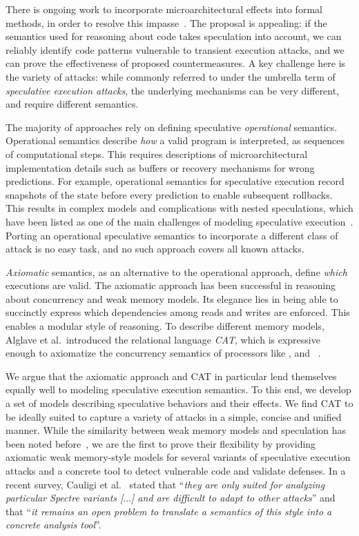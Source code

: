 \documentclass[conference]{IEEEtran}
\begin{document}
There is ongoing work to incorporate microarchitectural effects into formal methods, in order to resolve this impasse~\cite{CauligiDGTSRB20,DanielBR20,GuancialeBD20,GuarnieriKMRS20,spectaint,WangCBMR20,oo7,Wu019}. The proposal is appealing: if the semantics used for reasoning about code takes speculation into account, we can reliably identify code patterns vulnerable to transient execution attacks, and we can prove the effectiveness of proposed countermeasures. 
A key challenge here is the variety of attacks: while commonly referred to under the umbrella term of \emph{speculative execution attacks}, the underlying mechanisms can be very different, and require different semantics.


The majority of approaches rely on defining speculative \emph{operational} semantics.
Operational semantics describe \emph{how} a valid program is interpreted, as sequences of computational steps.
%
This requires descriptions of microarchitectural implementation details such as buffers or recovery mechanisms for wrong predictions. 
For example, operational semantics for speculative execution record snapshots of the state before every prediction to enable subsequent rollbacks.
% 
This results in complex models and complications with nested speculations, which have been listed as one of the main challenges of modeling speculative execution~\cite{GuarnieriKMRS20,OleksenkoTSF20}.
%
Porting an operational speculative semantics to incorporate a different class of attack is no easy task, and no such approach covers all known attacks. 

\emph{Axiomatic} semantics, as an alternative to the operational approach, define \emph{which} executions are valid. The axiomatic approach has been successful in reasoning about concurrency and weak memory models. Its elegance lies in being able to succinctly express which dependencies among reads and writes are enforced. 
This enables a modular style of reasoning.
To describe different memory models, Alglave et al.~introduced the relational language \emph{CAT}, which is expressive enough to axiomatize the concurrency semantics of processors like \xes, \power and \arm~\cite{cat,AlglaveDGHM21,AlglaveMT14}.

We argue that the axiomatic approach and CAT in particular lend themselves equally well to modeling speculative execution semantics. To this end, we develop a set of models describing speculative behaviors and their effects. 
We find CAT to be ideally suited to capture a variety of attacks in a simple, concise and unified manner. 
%
While the similarity between weak memory models and speculation has been noted before~\cite{ColvinW19,DisselkoenJJR19,checkmate}, we are the first to prove their flexibility by providing axiomatic weak memory-style models for several variants of speculative execution attacks and a concrete tool to detect vulnerable code and validate defenses. In a recent survey, Cauligi et al.~\cite{sok:spectre} stated that \enquote{\emph{they are only suited for analyzing particular Spectre variants [$\ldots$] and are difficult to adapt to other attacks}} and that \enquote{\emph{it remains an open problem to translate a semantics of this style into a concrete analysis tool}}.
%
\end{document}
